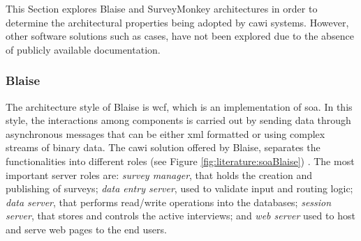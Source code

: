 	This Section explores Blaise and SurveyMonkey architectures in order to determine the architectural properties being adopted by \gls{cawi} systems. However, other software solutions such as \gls{cases}, have not been explored due to the absence of publicly available documentation.

	\subsubsection{Blaise}\label{sec:literature:blaise}
	The architecture style of Blaise is \gls{wcf}, which is an implementation of \gls{soa}. In this style, the interactions among components is carried out by sending data through asynchronous messages that can be either \gls{xml} formatted or using complex streams of binary data. The \gls{cawi} solution offered by Blaise, separates the functionalities into different roles (see Figure \ref{fig:literature:soaBlaise}) \cite{proc:segel15}. The most important server roles are: \emph{survey manager}, that holds the creation and publishing of surveys; \emph{data entry server}, used to validate input and routing logic; \emph{data server}, that performs read/write operations into the databases; \emph{session server}, that stores and controls the active interviews; and \emph{web server} used to host and serve web pages to the end users. %


